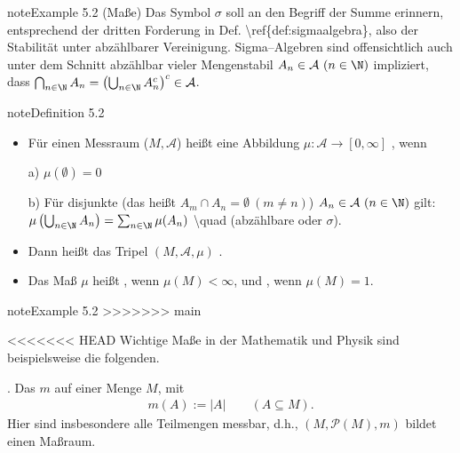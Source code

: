\documentclass[letterpaper,10pt,english]{jupyterBook}
\begin{document}
\begin{sphinxadmonition}{note}{Example 5.2 (Maße)}
\sphinxAtStartPar
Das Symbol \(\sigma\) soll an den Begriff der Summe erinnern, entsprechend der
dritten Forderung in Def. \textbackslash{}ref\{def:sigmaalgebra\}, also der Stabilität unter abzählbarer Vereinigung.
Sigma–Algebren sind offensichtlich auch unter dem Schnitt abzählbar vieler
Mengenstabil \(A_n\in \mathcal{A}\ (n\in\N)\) impliziert, dass \(\bigcap_{n\in \N} A_n = \left(\bigcup_{n\in\N} A_n^c\right)^c\in \mathcal{A}\).
\label{masstheorie/masstheorie:definition-1}
\begin{sphinxadmonition}{note}{Definition 5.2}


\begin{itemize}
\item {} 
\sphinxAtStartPar
Für einen Messraum (\(M, \mathcal{A}\)) heißt eine Abbildung \(\mu: \mathcal{A}\to [0, \infty]\) , wenn

\sphinxAtStartPar
a) \(\mu(\emptyset) = 0\)

\sphinxAtStartPar
b) Für disjunkte (das heißt \(A_m\cap A_n = \emptyset\ (m\neq n)\)) \(A_n\in \mathcal{A}\ (n\in\N)\) gilt: \(\mu\left( \bigcup_{n\in\N}A_n \right) = \sum_{n\in\N}\mu (A_n)\) \textbackslash{}quad (abzählbare oder \(\sigma\)\sphinxhyphen{}).

\item {} 
\sphinxAtStartPar
Dann heißt das Tripel \((M, \mathcal{A}, \mu)\) .

\item {} 
\sphinxAtStartPar
Das Maß \(\mu\) heißt , wenn \(\mu(M)<\infty\), und , wenn \(\mu(M)=1\).

\end{itemize}
\end{sphinxadmonition}
\label{masstheorie/masstheorie:example-2}
\begin{sphinxadmonition}{note}{Example 5.2}
>>>>>>> main



\sphinxAtStartPar
<<<<<<< HEAD
Wichtige Maße in der Mathematik und Physik sind beispielsweise die folgenden.

. Das  \(m\) auf einer  Menge \(M\), mit
\begin{equation*}
\begin{split}m(A):=|A|\qquad (A\subseteq M).\end{split}
\end{equation*}
\sphinxAtStartPar
Hier sind insbesondere alle Teilmengen messbar, d.h., \((M, \mathcal{P}(M), m)\) bildet einen Maßraum.


\end{sphinxadmonition}
\end{sphinxadmonition}
\end{document}
